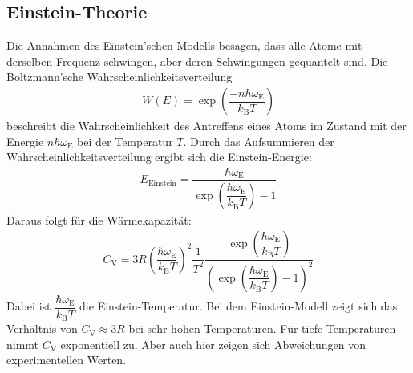 \subsection{Einstein-Theorie}
\label{sec:Einstein-Theorie}
Die Annahmen des Einstein’schen-Modells besagen, dass alle Atome mit derselben Frequenz schwingen, aber deren Schwingungen gequantelt sind. Die Boltzmann'sche Wahrscheinlichkeitsverteilung
\begin{align}
  \label{eqn:Boltzmann}
 W(E) = \exp\left(\dfrac{-n \hbar\omega_\mathrm{E}}{k_\mathrm{B}T}\right)
\end{align}
beschreibt die Wahrscheinlichkeit des Antreffens eines Atoms im Zustand mit der Energie $n \hbar\omega_\mathrm{E}$ bei der Temperatur $T$. Durch das Aufsummieren der Wahrscheinlichkeitsverteilung ergibt sich die Einstein-Energie:
\begin{align}
  \label{eqn:Einstein-Energie}
 E_\mathrm{Einstein} = \dfrac{\hbar\omega_\mathrm{E}}{\exp\left(\dfrac{\hbar\omega_\mathrm{E}}{k_\mathrm{B}T}\right)-1}
\end{align}
Daraus folgt für die Wärmekapazität:
\begin{align}
  \label{eqn:Einstein Wärmekapazität}
 C_\mathrm{V} = 3R \left(\dfrac{\hbar\omega_\mathrm{E}}{k_\mathrm{B}T}\right)^2 \dfrac{1}{T^2} \dfrac{\exp\left(\dfrac{\hbar\omega_\mathrm{E}}{k_\mathrm{B}T}\right)}{\left(\exp\left(\dfrac{\hbar\omega_\mathrm{E}}{k_\mathrm{B}T}\right)-1\right)^2}
\end{align}
Dabei ist $\dfrac{\hbar\omega_\mathrm{E}}{k_\mathrm{B}T}$ die Einstein-Temperatur. Bei dem Einstein-Modell zeigt sich das Verhältnis von $ C_\mathrm{V} \approx 3R$ bei sehr hohen Temperaturen. Für tiefe Temperaturen nimmt  $C_\mathrm{V}$ exponentiell zu. Aber auch hier zeigen sich Abweichungen von experimentellen Werten.
